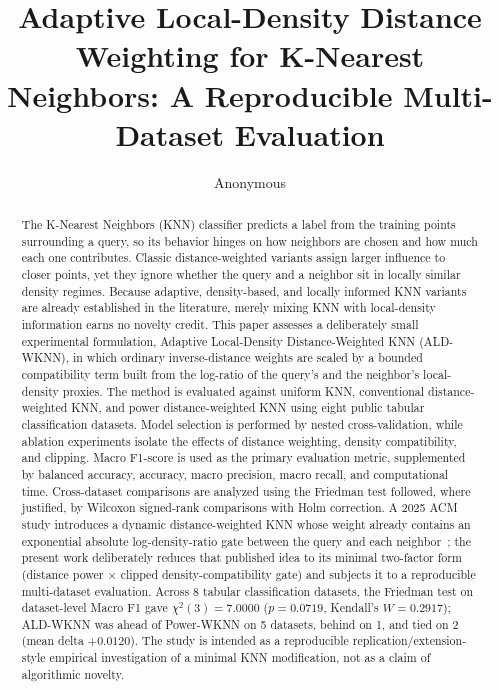 \documentclass[conference]{IEEEtran}
\title{Adaptive Local-Density Distance Weighting for K-Nearest Neighbors: A Reproducible Multi-Dataset Evaluation}
\author{Anonymous}
\begin{document}
\maketitle

\begin{abstract}
The K-Nearest Neighbors (KNN) classifier predicts a label from the training points surrounding a query, so its behavior hinges on how neighbors are chosen and how much each one contributes. Classic distance-weighted variants assign larger influence to closer points, yet they ignore whether the query and a neighbor sit in locally similar density regimes. Because adaptive, density-based, and locally informed KNN variants are already established in the literature, merely mixing KNN with local-density information earns no novelty credit. This paper assesses a deliberately small experimental formulation, Adaptive Local-Density Distance-Weighted KNN (ALD-WKNN), in which ordinary inverse-distance weights are scaled by a bounded compatibility term built from the log-ratio of the query's and the neighbor's local-density proxies. The method is evaluated against uniform KNN, conventional distance-weighted KNN, and power distance-weighted KNN using eight public tabular classification datasets. Model selection is performed by nested cross-validation, while ablation experiments isolate the effects of distance weighting, density compatibility, and clipping. Macro F1-score is used as the primary evaluation metric, supplemented by balanced accuracy, accuracy, macro precision, macro recall, and computational time. Cross-dataset comparisons are analyzed using the Friedman test followed, where justified, by Wilcoxon signed-rank comparisons with Holm correction. A 2025 ACM study introduces a dynamic distance-weighted KNN whose weight already contains an exponential absolute log-density-ratio gate between the query and each neighbor~\cite{dynamicdwknn2025}; the present work deliberately reduces that published idea to its minimal two-factor form (distance power $\times$ clipped density-compatibility gate) and subjects it to a reproducible multi-dataset evaluation. Across 8 tabular classification datasets, the Friedman test on dataset-level Macro F1 gave $\chi^2(3) = 7.0000$ ($p = 0.0719$, Kendall's $W = 0.2917$); ALD-WKNN was ahead of Power-WKNN on 5 datasets, behind on 1, and tied on 2 (mean delta $+0.0120$). The study is intended as a reproducible replication/extension-style empirical investigation of a minimal KNN modification, not as a claim of algorithmic novelty.
\end{abstract}
\end{document}
